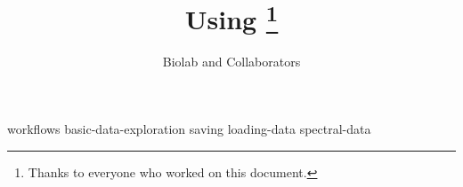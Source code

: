 \documentclass[symmetric, justified, a4paper]{tufte-book}
\title{Using \mutation\thanks{Thanks to everyone who worked on this document.}}
\author[Biolab and Collaborators]{Biolab and Collaborators}
\begin{document}
\frontmatter

\maketitle



\tableofcontents

%

\mainmatter



{workflows}
{basic-data-exploration}
{saving}
{loading-data}
{spectral-data}
















\backmatter





\printindex
\end{document}
